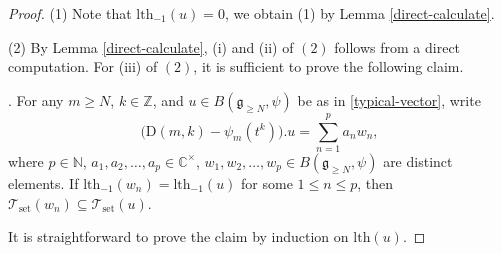 \documentclass[12pt, a4paper]{amsart}
\newcommand{\fg}{\mathfrak g}
\newcommand{\C}{\mathbb{C}}
\newcommand{\N}{\mathbb N}
\newcommand{\Z}{\mathbb Z}
\newcommand{\rD}{\mathrm{D}}
\theoremstyle{Theorem}
\theoremstyle{Theorem}
\numberwithin{equation}{section}
\begin{document}
\begin{proof} (1) Note that $\mathrm{lth}_{-1}(u)=0$, we obtain (1) by Lemma \ref{direct-calculate}.

(2) By Lemma \ref{direct-calculate}, (i) and (ii) of $(2)$ follows from a direct computation.
For (iii) of $(2)$, it is sufficient to prove the following claim.

\vspace{2mm}

. For any $m\geq N$, $k\in\Z$,
and $u\in B(\fg_{\geq N},\psi)$ be as in \eqref{typical-vector}, write
\[\big(\rD(m,k)-\psi_{m}(t^{k})\big).u=\sum_{n=1}^{p}a_{n}w_{n},\]
where $p\in\N$, $a_{1},a_{2},\dots,a_{p}\in\C^{\times}$,
$w_{1},w_{2},\dots,w_{p}\in B(\fg_{\geq N},\psi)$ are distinct elements.
If $\mathrm{lth}_{-1}(w_{n})=\mathrm{lth}_{-1}(u)$ for some $1\leq n\leq p$,
then $\mathcal{T}_{\mathrm{set}}(w_{n})\subseteq\mathcal{T}_{\mathrm{set}}(u)$.

\vspace{2mm}

It is straightforward to
prove the claim by induction on $\mathrm{lth}(u)$.
\end{proof}
\end{document}
